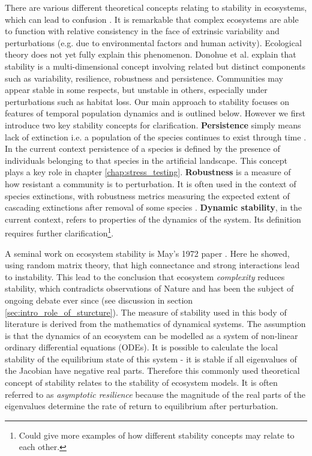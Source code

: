There are various different theoretical concepts relating to stability in ecosystems, which can lead to confusion \cite{arnoldi2015,mumby2014ecological}. It is remarkable that complex ecosystems are able to function with relative consistency in the face of extrinsic variability and perturbations (e.g. due to environmental factors and human activity). Ecological theory does not yet fully explain this phenomenon. Donohue et al. \cite{donohue2013dimensionality} explain that stability is a multi-dimensional concept involving related but distinct components such as variability, resilience, robustness and persistence. Communities may appear stable in some respects, but unstable in others, especially under perturbations such as habitat loss. Our main approach to stability focuses on features of temporal population dynamics and is outlined below. However we first introduce two key stability concepts for clarification. \textbf{Persistence} simply means lack of extinction i.e. a population of the species continues to exist through time \cite{dytham1995effect}. In the current context persistence of a species is defined by the presence of individuals belonging to that species in the artificial landscape. This concept plays a key role in chapter \ref{chap:stress_testing}. \textbf{Robustness} is a measure of how resistant a community is to perturbation. It is often used in the context of species extinctions, with robustness metrics measuring the expected extent of cascading extinctions after removal of some species \cite{evans2013robustness}. \textbf{Dynamic stability}, in the current context, refers to properties of the dynamics of the system. Its definition requires further clarification\footnote{Could give more examples of how different stability concepts may relate to each other.}.    

A seminal work on ecosystem stability is May's 1972 paper \cite{may1972will}. Here he showed, using random matrix theory, that high connectance and strong interactions lead to instability. This lead to the conclusion that ecosystem \emph{complexity} reduces stability, which contradicts observations of Nature and has been the subject of ongoing debate ever since (see discussion in section \ref{sec:intro_role_of_sturcture}). The measure of stability used in this body of literature is derived from the mathematics of dynamical systems. The assumption is that the dynamics of an ecosystem can be modelled as a system of non-linear ordinary differential equations (ODEs). It is possible to calculate the local stability of the equilibrium state of this system - it is stable if all eigenvalues of the Jacobian have negative real parts. Therefore this commonly used theoretical concept of stability relates to the stability of ecosystem models. It is often referred to as \emph{asymptotic resilience} \cite{arnoldi2015} because the magnitude of the real parts of the eigenvalues determine the rate of return to equilibrium after perturbation. 

